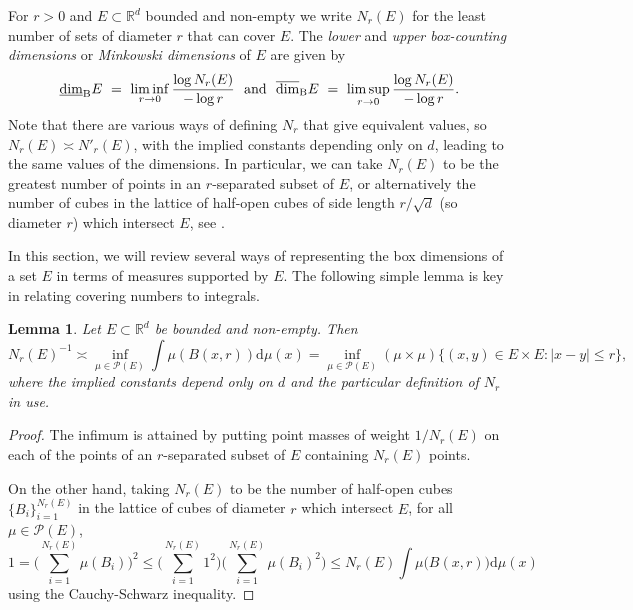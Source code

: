 \documentclass[12pt]{article}
\newcommand{\1}{{\bf 1}}
\newcommand\ubd{\overline{\mbox{\rm dim}}_{\rm B}} %
\newcommand\lbd{\underline{\mbox{\rm dim}}_{\rm B}} %
\newtheorem{lem}[theo]{Lemma}
\begin{document}
For $r>0$ and $E\subset \mathbb{R}^d$ bounded and non-empty we write $N_r(E)$ for the least number of sets of diameter $r$ that can cover $E$. 
The {\it lower} and {\it upper box-counting dimensions} or {\it Minkowski dimensions} of   $E $ are given by 
\begin{equation}\label{bdimdef}
\lbd E\ =\ \liminf_{r\to 0} \frac{\log  N_r(E)}{-\log r} \ \text{ and }\ 
\ubd E\ =\ \limsup_{r\to 0} \frac{\log  N_r(E)}{-\log r} .
\end{equation} 
Note that there are various ways of defining $N_r$ that give equivalent values, so $N_r(E)\asymp N'_r(E)$, with the implied constants depending only on $d$,  leading to the same values of the dimensions. In particular, we can take $  N_r(E)$ to be the greatest number of points in an $r$-separated subset of $E$, or alternatively the number of cubes  in the lattice of half-open cubes of side length $r/\sqrt{d}$ (so diameter $r$) which intersect $E$, see \cite{FaBk}. 

In this section, we will review several ways of representing the box dimensions of a set $E$ in terms of measures supported by $E$. The following simple lemma is key in relating covering numbers to integrals.

\begin{lem}\label{boxcount}
Let $E\subset \mathbb{R}^d$ be bounded and non-empty. Then 
\begin{equation}\label{nre}
N_r(E)^{-1} \asymp \inf_{\mu \in  {\mathcal P}(E)} \int \mu(B(x,r))\mathrm{d}\mu(x) = \inf_{\mu \in  {\mathcal P}(E)}(\mu\times\mu)\{(x,y) \in E \times E :|x-y|\leq r\},
\end{equation} 
where the implied constants depend only on $d$ and the particular definition of $N_r$ in use.
\end{lem}
\begin{proof}
The infimum is attained by putting point masses of weight $1/N_r(E)$ on each of the points of an $r$-separated subset of $E$ containing $N_r(E)$ points. 

On the other hand, taking $N_r(E)$ to be the number of half-open cubes $\{B_i\}_{i=1}^{N_r(E)}$ in the lattice of cubes of diameter $r$ which intersect $E$, for all $\mu \in  {\mathcal P}(E)$,
$$1 =\bigg(\sum_{i=1}^{N_r(E)} \mu  (B_i)\bigg)^2 \leq \bigg(\sum_{i=1}^{N_r(E)} 1^2\bigg) \bigg(\sum_{i=1}^{N_r(E)}\mu  (B_i)^2\bigg) \leq N_r(E) \int \mu\big(B(x,r)\big)\mathrm{d}\mu(x)$$                                                                                                                                                                                                                                                                                                                                                                                                                                                                                                                                                                               
using the Cauchy-Schwarz inequality.
\end{proof}
\end{document}

